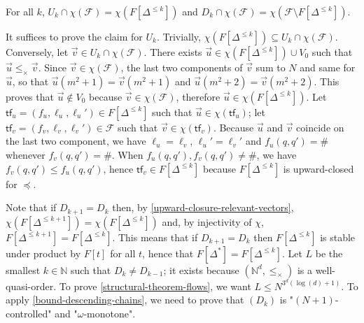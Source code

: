 \documentclass[10pt,a4paper]{article}
\let\mathbb\mathds
\renewcommand{\leq}{\leqslant}
\newcommand{\nats}{\mathbb{N}}
\newcommand{\transitions}{\Delta}
\newcommand*{\atrans}{t}
\newcommand*{\abuchistate}{\ell}
\newcommand*{\bstate}{\abuchistate}
\newcommand*{\dummysymb}{\#}
\newcommand*{\transferflows}{\mathcal{F}}
\newcommand*{\transfersof}[1]{F[#1]}
\newcommand*{\atf}{\mathsf{tf}}
\newcommand*{\letf}{\preceq}
\newcommand*{\zerovectors}{V_0}
\newcommand*{\leprod}{\leq_{\times}}
\newcommand*{\mapencoding}{\chi}
\newcommand*{\relevantvectors}{\mapencoding(\transferflows)}
\begin{document}
\begin{lemmarep}
	\label{upward-closure-relevant-vectors}
	For all \(k\), \(U_k \cap \relevantvectors = \mapencoding(\transfersof{\transitions^{\leq k}})\) and \(D_k \cap \relevantvectors = \mapencoding(\transferflows \setminus \transfersof{\transitions^{\leq k}})\).
\end{lemmarep}
\begin{appendixproof}
	It suffices to prove the claim for \(U_k\).
	Trivially, \(\mapencoding(\transfersof{\transitions^{\leq k}}) \subseteq U_k \cap \relevantvectors\).
	Conversely, let \(\vec{v} \in U_k \cap \relevantvectors\).
	There exists \(\vec{u} \in \mapencoding(\transfersof{\transitions^{\leq k}}) \cup \zerovectors\) such that \(\vec{u} \leprod \vec{v}\).
	Since \(\vec{v} \in \relevantvectors\), the last two components of \(\vec{v}\) sum to \(N\) and same for \(\vec{u}\), so that \(\vec{u}(m^2+1) = \vec{v}(m^2+1)\) and \(\vec{u}(m^2+2) = \vec{v}(m^2+2)\).
	This proves that \(\vec{u} \notin \zerovectors\) because \(\vec{v} \in \relevantvectors\), therefore \(\vec{u} \in \mapencoding(\transfersof{\transitions^{\leq k}})\).
	Let \(\atf_u = (f_u,\bstate_u, \bstate_u') \in \transfersof{\transitions^{\leq k}}\) such that \(\vec{u} \in \mapencoding(\atf_u)\); let \(\atf_v = (f_v, \bstate_v, \bstate_v') \in \transferflows\) such that \( \vec{v} \in \mapencoding(\atf_v)\).
	Because \(\vec{u}\) and \(\vec{v}\) coincide on the last two component, we have \(\bstate_u = \bstate_v\), \(\bstate_u' = \bstate_v'\) and \(f_u(q,q') = \dummysymb\) whenever \(f_v(q,q') = \dummysymb\).
	When \(f_u(q,q'), f_v(q,q') \ne \dummysymb\), we have \(f_v(q,q') \leq f_u(q,q')\), hence \(\atf_v \in \transfersof{\transitions^{\leq k}}\) because \(\transfersof{\transitions^{\leq k}}\) is upward-closed for \(\letf\).
\end{appendixproof}

%
Note that if \(D_{k+1} = D_k\) then, by \cref{upward-closure-relevant-vectors}, \(\mapencoding(\transfersof{\transitions^{\leq k+1}}) = \mapencoding(\transfersof{\transitions^{\leq k}})\) and, by injectivity of \(\mapencoding\), \(\transfersof{\transitions^{\leq k+1}} = \transfersof{\transitions^{\leq k}}\).
This means that if \(D_{k+1} = D_k\) then \(\transfersof{\transitions^{\leq k}}\) is stable under product by \(\transfersof{\atrans}\) for all \(\atrans\), hence that \(\transfersof{\transitions^*} = \transfersof{\transitions^{\leq k}}\).
Let \(L\) be the smallest \(k \in \nats\) such that \(D_{k} \ne D_{k-1}\); it exists because \((\nats^d, \leprod)\) is a well-quasi-order.
To prove \cref{structural-theorem-flows}, we want \(L \leq N^{3^{d} (\log(d)+1)}\).
To apply \cref{bound-descending-chains}, we need to prove that \((D_k)\) is "\((N+1)\)-controlled" and "\(\omega\)-monotone".
\end{document}
